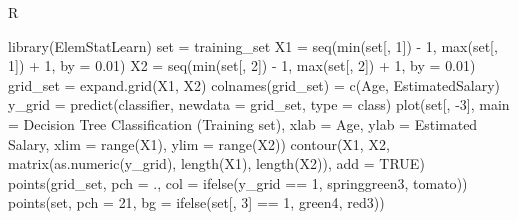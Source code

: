 \documentclass[
]{book}
\newenvironment{Shaded}{\begin{snugshade}}{\end{snugshade}}
\newcommand{\AttributeTok}[1]{\textcolor[rgb]{0.77,0.63,0.00}{#1}}
\newcommand{\ConstantTok}[1]{\textcolor[rgb]{0.00,0.00,0.00}{#1}}
\newcommand{\DecValTok}[1]{\textcolor[rgb]{0.00,0.00,0.81}{#1}}
\newcommand{\FloatTok}[1]{\textcolor[rgb]{0.00,0.00,0.81}{#1}}
\newcommand{\FunctionTok}[1]{\textcolor[rgb]{0.00,0.00,0.00}{#1}}
\newcommand{\NormalTok}[1]{#1}
\newcommand{\OtherTok}[1]{\textcolor[rgb]{0.56,0.35,0.01}{#1}}
\newcommand{\SpecialCharTok}[1]{\textcolor[rgb]{0.00,0.00,0.00}{#1}}
\newcommand{\StringTok}[1]{\textcolor[rgb]{0.31,0.60,0.02}{#1}}
\theoremstyle{definition}
\theoremstyle{definition}
\theoremstyle{definition}
\theoremstyle{definition}
\theoremstyle{remark}
\begin{document}
R

\begin{Shaded}
\begin{Highlighting}[]
\FunctionTok{library}\NormalTok{(ElemStatLearn)}
\NormalTok{set }\OtherTok{=}\NormalTok{ training\_set}
\NormalTok{X1 }\OtherTok{=} \FunctionTok{seq}\NormalTok{(}\FunctionTok{min}\NormalTok{(set[, }\DecValTok{1}\NormalTok{]) }\SpecialCharTok{{-}} \DecValTok{1}\NormalTok{, }\FunctionTok{max}\NormalTok{(set[, }\DecValTok{1}\NormalTok{]) }\SpecialCharTok{+} \DecValTok{1}\NormalTok{, }\AttributeTok{by =} \FloatTok{0.01}\NormalTok{)}
\NormalTok{X2 }\OtherTok{=} \FunctionTok{seq}\NormalTok{(}\FunctionTok{min}\NormalTok{(set[, }\DecValTok{2}\NormalTok{]) }\SpecialCharTok{{-}} \DecValTok{1}\NormalTok{, }\FunctionTok{max}\NormalTok{(set[, }\DecValTok{2}\NormalTok{]) }\SpecialCharTok{+} \DecValTok{1}\NormalTok{, }\AttributeTok{by =} \FloatTok{0.01}\NormalTok{)}
\NormalTok{grid\_set }\OtherTok{=} \FunctionTok{expand.grid}\NormalTok{(X1, X2)}
\FunctionTok{colnames}\NormalTok{(grid\_set) }\OtherTok{=} \FunctionTok{c}\NormalTok{(}\StringTok{\textquotesingle{}Age\textquotesingle{}}\NormalTok{, }\StringTok{\textquotesingle{}EstimatedSalary\textquotesingle{}}\NormalTok{)}
\NormalTok{y\_grid }\OtherTok{=} \FunctionTok{predict}\NormalTok{(classifier, }\AttributeTok{newdata =}\NormalTok{ grid\_set, }\AttributeTok{type =} \StringTok{\textquotesingle{}class\textquotesingle{}}\NormalTok{)}
\FunctionTok{plot}\NormalTok{(set[, }\SpecialCharTok{{-}}\DecValTok{3}\NormalTok{],}
     \AttributeTok{main =} \StringTok{\textquotesingle{}Decision Tree Classification (Training set)\textquotesingle{}}\NormalTok{,}
     \AttributeTok{xlab =} \StringTok{\textquotesingle{}Age\textquotesingle{}}\NormalTok{, }\AttributeTok{ylab =} \StringTok{\textquotesingle{}Estimated Salary\textquotesingle{}}\NormalTok{,}
     \AttributeTok{xlim =} \FunctionTok{range}\NormalTok{(X1), }\AttributeTok{ylim =} \FunctionTok{range}\NormalTok{(X2))}
\FunctionTok{contour}\NormalTok{(X1, X2, }\FunctionTok{matrix}\NormalTok{(}\FunctionTok{as.numeric}\NormalTok{(y\_grid), }\FunctionTok{length}\NormalTok{(X1), }\FunctionTok{length}\NormalTok{(X2)), }\AttributeTok{add =} \ConstantTok{TRUE}\NormalTok{)}
\FunctionTok{points}\NormalTok{(grid\_set, }\AttributeTok{pch =} \StringTok{\textquotesingle{}.\textquotesingle{}}\NormalTok{, }\AttributeTok{col =} \FunctionTok{ifelse}\NormalTok{(y\_grid }\SpecialCharTok{==} \DecValTok{1}\NormalTok{, }\StringTok{\textquotesingle{}springgreen3\textquotesingle{}}\NormalTok{, }\StringTok{\textquotesingle{}tomato\textquotesingle{}}\NormalTok{))}
\FunctionTok{points}\NormalTok{(set, }\AttributeTok{pch =} \DecValTok{21}\NormalTok{, }\AttributeTok{bg =} \FunctionTok{ifelse}\NormalTok{(set[, }\DecValTok{3}\NormalTok{] }\SpecialCharTok{==} \DecValTok{1}\NormalTok{, }\StringTok{\textquotesingle{}green4\textquotesingle{}}\NormalTok{, }\StringTok{\textquotesingle{}red3\textquotesingle{}}\NormalTok{))}
\end{Highlighting}
\end{Shaded}
\end{document}
